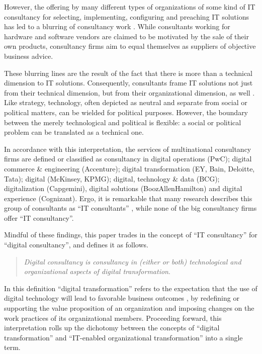 \documentclass[12pt]{article}
\begin{document}
However, the offering by many different types of organizations of some
kind of IT consultancy for selecting, implementing, configuring and
preaching IT solutions has led to a blurring of consultancy work
\citetext{\citealp[ 31]{bloomfield1995}; \citealp[ 162]{kipping2012}}.
While consultants working for hardware and software vendors are claimed
to be motivated by the sale of their own products, consultancy firms aim
to equal themselves as suppliers of objective business advice.

These blurring lines are the result of the fact that there is more than
a technical dimension to IT solutions. Consequently, consultants frame
IT solutions not just from their technical dimension, but from their
organizational dimension, as well \citep[ 24-25]{bloomfield1995}. Like
strategy, technology, often depicted as neutral and separate from social
or political matters, can be wielded for political purposes. However,
the boundary between the merely technological and political is flexible:
a social or political problem can be translated as a technical one.

In accordance with this interpretation, the services of multinational
consultancy firms are defined or classified as consultancy in digital
operations (PwC); digital commerce \& engineering (Accenture); digital
transformation (EY, Bain, Deloitte, Tata); digital (McKinsey, KPMG);
digital, technology \& data (BCG); digitalization (Capgemini), digital
solutions (BoozAllenHamilton) and digital experience (Cognizant). Ergo,
it is remarkable that many research describes this group of consultants
as ``IT consultants''
\citep{nevo2007, loh1992, fincham2006, armbruster2006, bloomfield1995, schwarz2005},
while none of the big consultancy firms offer ``IT consultancy''.

Mindful of these findings, this paper trades in the concept of ``IT
consultancy'' for ``digital consultancy'', and defines it as follows.

\begin{quote}
\emph{Digital consultancy is consultancy in (either or both)
technological and organizational aspects of digital transformation}.
\end{quote}

In this definition ``digital transformation'' refers to the expectation
that the use of digital technology will lead to favorable business
outcomes \citep[ 104-118]{wessel2020}, by redefining or supporting the
value proposition of an organization and imposing changes on the work
practices of its organizational members. Proceeding forward, this
interpretation rolls up the dichotomy between the concepts of ``digital
transformation'' and ``IT-enabled organizational transformation'' into a
single term.
\end{document}
